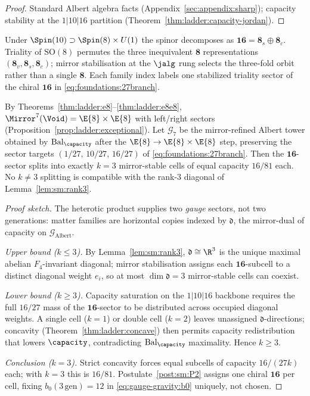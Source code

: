 \begin{proof}
Standard Albert algebra facts (Appendix~\ref{sec:appendix:sharp}); capacity
stability at the $1|10|16$ partition
(Theorem~\ref{thm:ladder:capacity-jordan}).
\end{proof}

\begin{proposition}\label{prop:sm:triality}
Under $\Spin(10)\supset\Spin(8)\times U(1)$ the spinor decomposes as
$\mathbf{16}=\mathbf{8}_s\oplus\mathbf{8}_c$. Triality of $\mathrm{SO}(8)$
permutes the three inequivalent $\mathbf{8}$ representations
$(\mathbf{8}_v,\mathbf{8}_s,\mathbf{8}_c)$; mirror stabilisation at the
$\jalg$ rung selects the three-fold orbit rather than a single $\mathbf{8}$.
Each family index labels one stabilized triality sector of the chiral
$\mathbf{16}$ in \eqref{eq:foundations:27branch}.
\end{proposition}

\begin{proposition}\label{prop:sm:capacity7}
By Theorems~\ref{thm:ladder:e8}--\ref{thm:ladder:e8e8},
$\Mirror^7(\Void)=\E{8}\times\E{8}$ with left/right sectors
(Proposition~\ref{prop:ladder:exceptional}). Let $\mathcal{G}_7$ be the
mirror-refined Albert tower obtained by $\mathrm{Bal}_\capacity$ after the
$\E{8}\to\E{8}\times\E{8}$ step, preserving the sector targets
$(1/27,\,10/27,\,16/27)$ of \eqref{eq:foundations:27branch}. Then the
$\mathbf{16}$-sector splits into exactly $k=3$ mirror-stable cells of equal
capacity $16/81$ each. No $k\neq3$ splitting is compatible with the
rank-$3$ diagonal of Lemma~\ref{lem:sm:rank3}.
\end{proposition}

\begin{proof}[Proof sketch]
The heterotic product supplies two \emph{gauge} sectors, not two generations:
matter families are horizontal copies indexed by $\mathfrak{d}$, the
mirror-dual of capacity on $\mathcal{G}_{\mathrm{Albert}}$.

\emph{Upper bound ($k\leq3$).}
By Lemma~\ref{lem:sm:rank3}, $\mathfrak{d}\cong\R^3$ is the unique maximal
abelian $F_4$-invariant diagonal; mirror stabilisation assigns each
$\mathbf{16}$-subcell to a distinct diagonal weight $e_i$, so at most
$\dim\mathfrak{d}=3$ mirror-stable cells can coexist.

\emph{Lower bound ($k\geq3$).}
Capacity saturation on the $1|10|16$ backbone requires the full
$16/27$ mass of the $\mathbf{16}$-sector to be distributed across occupied
diagonal weights. A single cell ($k=1$) or double cell ($k=2$) leaves
unassigned $\mathfrak{d}$-directions; concavity
(Theorem~\ref{thm:ladder:concave}) then permits capacity redistribution that
lowers $\capacity$, contradicting $\mathrm{Bal}_\capacity$ maximality.
Hence $k\geq3$.

\emph{Conclusion ($k=3$).}
Strict concavity forces equal subcells of capacity $16/(27k)$ each; with
$k=3$ this is $16/81$. Postulate~\ref{post:sm:P2} assigns one chiral
$\mathbf{16}$ per cell, fixing $b_0(3\,\mathrm{gen})=12$ in
\eqref{eq:gauge-gravity:b0} uniquely, not chosen.
\end{proof}

